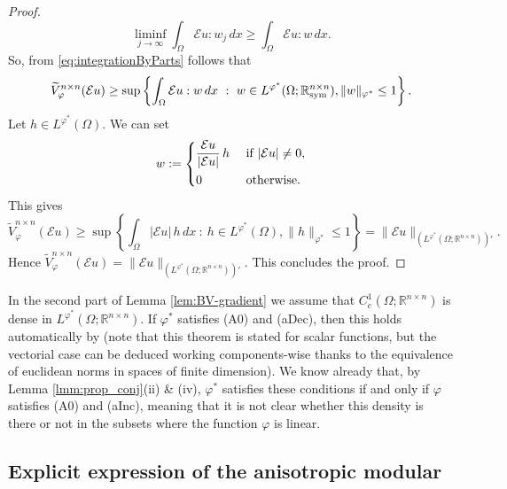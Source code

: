 \documentclass[a4paper,11pt,oneside,notitlepage]{article}
\numberwithin{equation}{section}
\def\R{\mathbb{R}}
\def\sym{{\rm sym}}
\newcommand{\vphi}{\varphi}
\newcommand{\E}{\mathcal{E}}
\newcommand{\st}{ \ : \ }
\begin{document}
\begin{proof}
    \begin{equation*}
        \liminf_{j \to \infty} \int_\Omega \E u : w_j \, dx \ge \int_\Omega \E u : w \, dx.
    \end{equation*}
    So, from \eqref{eq:integrationByParts} follows that 
    \begin{equation*}
        \widetilde{V}^{n \times n}_\vphi(\E u) \ge \sup \left\{ \int_\Omega \E u : w \, dx \st w \in L^{\vphi^*}(\Omega; \R^{n \times n}_\sym), \| w\|_{\vphi^*} \le 1 \right\}.
    \end{equation*}
    Let $h\in L^{\vphi^*}(\Omega)$. We can set
    \begin{equation*}
        w :=
        \begin{dcases}
            \frac{\mathcal E u}{|\mathcal E u|} \, h & \textnormal{ if } |\mathcal E u|\neq 0, \\
            0 & \textnormal{ otherwise.}
        \end{dcases}
    \end{equation*}
    This gives 
    \begin{equation*}
        \widetilde{V}^{n \times n}_\vphi( \E u) \ge \sup \left\{ \int_\Omega |\E u| \, h \, dx \st h \in L^{\vphi^*}(\Omega), \| h\|_{\vphi^*}\le 1 \right\} = \| \E u \|_{(L^{\vphi^*}(\Omega;\R^{n \times n}))'}.
    \end{equation*}
    Hence $\widetilde{V}^{n \times n}_\vphi(\E u) = \| \E u \|_{(L^{\vphi^*}(\Omega;\R^{n \times n}))'}$. This concludes the proof.
\end{proof}

In the second part of Lemma \ref{lem:BV-gradient} we assume that $C^1_c(\Omega; \R^{n \times n})$ is dense in $L^{\vphi^*}(\Omega; \R^{n \times n})$. If $\vphi^*$ satisfies (A0) and (aDec), then this holds automatically by \cite[Theorem 3.7.15]{HaH} (note that this theorem is stated for scalar functions, but the vectorial case can be deduced working components-wise thanks to the equivalence of euclidean norms in spaces of finite dimension). We know already that, by Lemma \ref{lmm:prop_conj}(ii) \& (iv), $\vphi^*$ satisfies these conditions if and only if $\vphi$ satisfies (A0) and (aInc), meaning that it is not clear whether this density is there or not in the subsets where the function $\vphi$ is linear.


\subsection{Explicit expression of the anisotropic modular}
\label{sec:modular}
\end{document}
